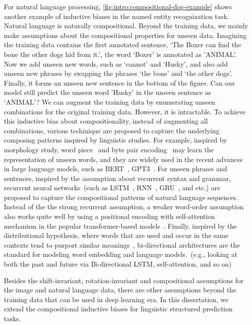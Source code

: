  For natural
language processing, \autoref{fig:intro:compositional-dog-example} shows
another example of inductive biases in the named entity recognization
task. Natural language is naturally compositional. Beyond the training
data, we mainly make assumptions about the compositional properties
for unseen data. Imagining the training data contains the first
annotated sentence, `The Boxer can find the bone the other dogs hid
from it.', the word `Boxer' is annotated as 'ANIMAL'. Now we add
unseen new words, such as `cannot' and `Husky', and also add unseen
new phrases by swapping the phrases `the bone' and `the other
dogs'. Finally, it forms an unseen new sentence in the bottom of the
figure. Can our model still predict the unseen word 'Husky' in the
unseen sentence as `ANIMAL'? We can augment the training
data by enumerating unseen combinations for the original training
data. However, it is intractable. To achieve this inductive bias about
compositionality, instead of augmenting all combinations, various
techinique are proposed to capture the underlying composing patterns
inspired by linguistic studies. For example, inspired by morphology
study, word piece~\citep{schuster2012japanese} and byte pair
encoding~\citep[BPE,][]{sennrich2016neural} may learn the
representation of unseen words, and they are widely used in the
recent advances in large language models, such as
BERT~\citep{devlin2019bert}, GPT3~\citep{brown2020language}. For
unseen phrases and sentences, inspired by the assumption about
recurrent syntax and grammar, recurrent neural networks~(such as
LSTM~\citep{hochreiter97lstm}, RNN~\citep{mesnil13rnn},
GRU~\citep{chung14gru}, and etc.)  are proposed to capture the
compositional patterns of natural language sequences. Instead of the
the strong recurrent assumption, a weaker word-order assumption also works
quite well by using a positional encoding with self-attention
mechanism in the popular transformer-based
models~\citep{NIPS2017_7181}. Finally, inspired by the distributional
hypothesis, where words that are used and occur in the same contexts
tend to purport similar meanings~\cite{harris1954distributional},
bi-directional architectures are the standard for modeling word
embedding and language models.~(e.g., looking at both the past and future
via Bi-directional LSTM, self-attention, and so on)

Besides the shift-invariant, rotation-invariant and compositional
assumptions for the  image and natural language data, there
are other assumptions beyond the training data that can be used in
deep learning era. In this dissertation, we extend the compositional
inductive biases for linguistic structured prediction
tasks.%


